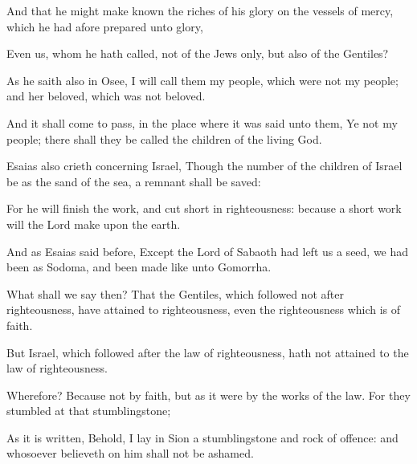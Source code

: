 {And
that he might make
known the
riches of
his
glory
on the
vessels of
mercy,
which he had afore
prepared
unto
glory,

Even
us,
whom he hath
called,
not
of the
Jews
only,
but
also
of the
Gentiles?

As he
saith
also
in
Osee, I will
call
them
my
people, which
were
not
my
people;
and
her
beloved, which
was
not
beloved.

And it shall come to
pass,
{}
in the
place
where it was
said unto
them,
Ye
{}
not
my
people;
there shall they be
called the
children of
the
living
God.

Esaias
also
crieth
concerning
Israel,
Though the
number of the
children of
Israel
be
as the
sand of the
sea, a
remnant shall be
saved:

For he will
finish the
work,
and
cut
{}
short
in
righteousness:
because
a
short
work
will the
Lord
make
upon the
earth.

And
as
Esaias said
before,
Except the
Lord of
Sabaoth had
left
us a
seed, we had
been
as
Sodoma,
and been made
like unto
Gomorrha.

What shall we
say
then?
That the
Gentiles, which
followed
not
after
righteousness, have attained
to
righteousness,
even the
righteousness which
is
of
faith.

But
Israel, which followed
after the
law of
righteousness,
hath
not
attained
to the
law of
righteousness.

Wherefore?
Because
{}
not
by
faith,
but as it
were
by the
works of the
law.
For they
stumbled at
that
stumblingstone;

As it is
written,
Behold, I
lay
in
Sion a
stumblingstone
and
rock of
offence:
and
whosoever
believeth
on
him
shall
not be
ashamed.




\par }
